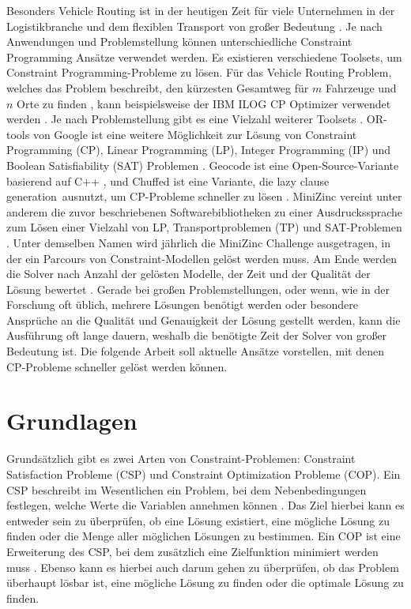 Besonders Vehicle Routing ist in der heutigen Zeit für viele Unternehmen in der
Logistikbranche und dem flexiblen Transport von großer Bedeutung
\cite[1]{delec22jo}. Je nach Anwendungen und Problemstellung können
unterschiedliche Constraint Programming Ansätze verwendet werden. Es existieren
verschiedene Toolsets, um Constraint Programming-Probleme zu lösen. Für das
Vehicle Routing Problem, welches das Problem beschreibt, den kürzesten Gesamtweg
für \( m \) Fahrzeuge und \( n \) Orte zu finden \cite[222]{labor18jo}, kann
beispielsweise der IBM ILOG CP Optimizer verwendet werden \cite{IBMIwe}. Je nach
Problemstellung gibt es eine Vielzahl weiterer Toolsets \cite{Solviwea}.
OR-tools von Google ist eine weitere Möglichkeit zur Lösung von Constraint
Programming (CP), Linear Programming (LP), Integer Programming (IP) und Boolean
Satisfiability (SAT) Problemen \cite{ORToowe}. Geocode ist eine
Open-Source-Variante basierend auf C++ \cite{GECODwe}, und Chuffed ist eine
Variante, die \grqq lazy clause generation\grqq\ ausnutzt, um CP-Probleme
schneller zu lösen \cite{Chuff24co}. MiniZinc vereint unter anderem die zuvor
beschriebenen Softwarebibliotheken zu einer Ausdruckssprache zum Lösen einer
Vielzahl von LP, Transportproblemen (TP) und SAT-Problemen \cite{MiniZwe}. Unter
demselben Namen wird jährlich die MiniZinc Challenge ausgetragen, in der ein
Parcours von Constraint-Modellen gelöst werden muss. Am Ende werden die Solver
nach Anzahl der gelösten Modelle, der Zeit und der Qualität der Lösung bewertet
\cite{Homewe}. Gerade bei großen Problemstellungen, oder wenn, wie in der
Forschung oft üblich, mehrere Lösungen benötigt werden oder besondere Ansprüche
an die Qualität und Genauigkeit der Lösung gestellt werden, kann die Ausführung
oft lange dauern, weshalb die benötigte Zeit der Solver von großer Bedeutung
ist. Die folgende Arbeit soll aktuelle Ansätze vorstellen, mit denen CP-Probleme
schneller gelöst werden können.


\section{Grundlagen}
\label{sec:Grundlagen}
Grundsätzlich gibt es zwei Arten von Constraint-Problemen: Constraint
Satisfaction Probleme (CSP) und Constraint Optimization Probleme (COP). Ein CSP
beschreibt im Wesentlichen ein Problem, bei dem Nebenbedingungen festlegen,
welche Werte die Variablen annehmen können \cite[13]{rossi06bo}. Das Ziel
hierbei kann es entweder sein zu überprüfen, ob eine Lösung existiert, eine
mögliche Lösung zu finden oder die Menge aller möglichen Lösungen zu bestimmen.
Ein COP ist eine Erweiterung des CSP, bei dem zusätzlich eine Zielfunktion
minimiert werden muss \cite[171]{rossi06bo}. Ebenso kann es hierbei auch darum
gehen zu überprüfen, ob das Problem überhaupt lösbar ist, eine mögliche Lösung
zu finden oder die optimale Lösung zu finden.


